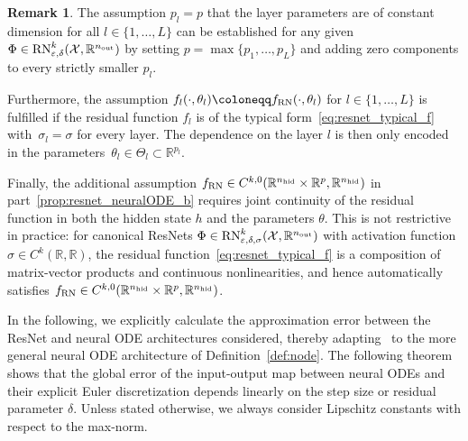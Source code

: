 \documentclass[10pt]{article}
\theoremstyle{definition}
\newtheorem{remark}[theorem]{Remark}
\numberwithin{equation}{section}
\newcommand{\eps}{\varepsilon}
\newcommand{\R}{\mathbb{R}}
\newcommand*{\nout}{n_\textup{out}}
\newcommand*{\nhid}{n_\textup{hid}}
\newcommand*{\RN}{\textup{RN}_{\eps,\delta}^k(\mathcal{X},\R^{\nout})}
\begin{document}
\begin{remark}
	The assumption $p_l = p$ that the layer parameters are of constant dimension for all $l \in \{1,\ldots, L\}$ can be established for any given $\Phi \in \RN$ by setting $p = \max\{p_1, \ldots, p_L\}$ and adding zero components to every strictly smaller $p_l$.
	
	Furthermore, the assumption $f_l(\cdot,\theta_l) \coloneqq f_\textup{RN}(\cdot,\theta_l)$ for $l\in \{1,\ldots,L\}$ is fulfilled if the residual function $f_l$ is of the typical form~\eqref{eq:resnet_typical_f} with~$\sigma_l = \sigma$ for every layer. The dependence on the layer $l$ is then only encoded in the parameters~$\theta_l \in \Theta_l \subset \R^{p_l}$.

    Finally, the additional assumption $f_\textup{RN} \in C^{k,0}(\R^{\nhid}\times\R^p,\R^{\nhid})$ in part~\ref{prop:resnet_neuralODE_b} requires joint continuity of the residual function in both the hidden state $h$ and the parameters $\theta$. This is not restrictive in practice: for canonical ResNets $\Phi \in \textup{RN}^k_{\eps,\delta,\sigma}(\mathcal{X},\R^{\nout})$ with activation function $\sigma \in C^k(\R,\R)$, the residual function~\eqref{eq:resnet_typical_f} is a composition of matrix-vector products and continuous nonlinearities, and hence automatically satisfies $f_\textup{RN} \in C^{k,0}(\R^{\nhid}\times\R^p,\R^{\nhid})$.
\end{remark}

In the following, we explicitly calculate the approximation error between the ResNet and neural ODE architectures considered, thereby adapting~\cite[Proposition 1]{Sander2022} to the more general neural ODE architecture of Definition~\ref{def:node}. The following theorem shows that the global error of the input-output map between neural ODEs and their explicit Euler discretization depends linearly on the step size or residual parameter $\delta$. Unless stated otherwise, we always consider Lipschitz constants with respect to the max-norm.
\end{document}
